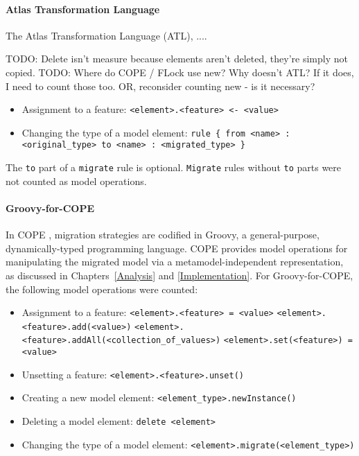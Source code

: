 \paragraph{Atlas Transformation Language}
The Atlas Transformation Language (ATL), ....

TODO: Delete isn't measure because elements aren't deleted, they're simply not copied.
TODO: Where do COPE / FLock use new? Why doesn't ATL? If it does, I need to count those too. OR, reconsider counting new - is it necessary?

\begin{itemize}
	\item Assignment to a feature:
	\subitem \texttt{<element>.<feature> <- <value>} 
	
	\item Changing the type of a model element:
	\subitem \texttt{rule \{ from <name> : <original_type> to <name> : <migrated_type> \}}
\end{itemize}

The \texttt{to} part of a \texttt{migrate} rule is optional. \texttt{Migrate} rules without \texttt{to} parts were not counted as model operations.

\paragraph{Groovy-for-COPE}
In COPE \cite{cope}, migration strategies are codified in Groovy, a general-purpose, dynamically-typed programming language. COPE provides model operations for manipulating the migrated model via a metamodel-independent representation, as discussed in Chapters~\ref{Analysis} and \ref{Implementation}. For Groovy-for-COPE, the following model operations were counted:

\begin{itemize}
	\item Assignment to a feature:
	\subitem \texttt{<element>.<feature> = <value>}
	\subitem \texttt{<element>.<feature>.add(<value>)}
	\subitem \texttt{<element>.<feature>.addAll(<collection\_of\_values>)}
	\subitem \texttt{<element>.set(<feature>) = <value>}
	
	\item Unsetting a feature:
	\subitem \texttt{<element>.<feature>.unset()}	
	
	\item Creating a new model element:
	\subitem \texttt{<element\_type>.newInstance()}
	
	\item Deleting a model element:
	\subitem \texttt{delete <element>}
	
	\item Changing the type of a model element:
	\subitem \texttt{<element>.migrate(<element\_type>)}
\end{itemize}

